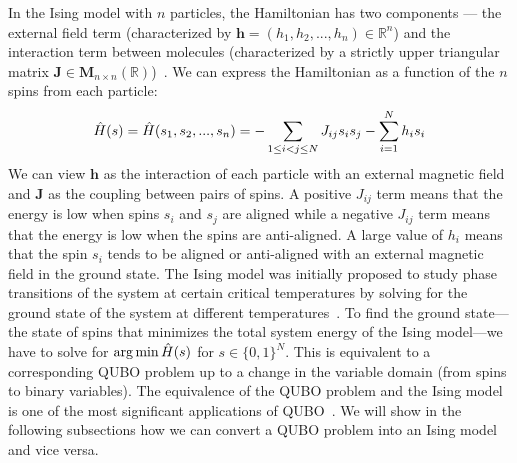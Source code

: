 In the Ising model with $n$ particles, the Hamiltonian has two components --- the external field term (characterized by $\mathbf{h} = (h_1, h_2, ..., h_n) \in \mathbb{R}^n$) and the interaction term between molecules (characterized by a strictly upper triangular matrix $\mathbf{J} \in \boldsymbol{M}_{n\times n}(\mathbb{R})$)~\cite{b10}. We can express the Hamiltonian as a function of the $n$ spins from each particle:
\begin{equation}
    \Hat{H}(s) = \Hat{H}(s_1, s_2, ... , s_n) = -\sum_{1\leq i < j \leq N} J_{ij}s_i s_j - \sum_{i=1}^N h_i s_i
\end{equation}
We can view $\mathbf{h}$ as the interaction of each particle with an external magnetic field and $\mathbf{J}$ as the coupling between pairs of spins. A positive $J_{ij}$ term means that the energy is low when spins $s_i$ and $s_j$ are aligned while a negative $J_{ij}$ term means that the energy is low when the spins are anti-aligned. A large value of $h_i$ means that the spin $s_i$ tends to be aligned or anti-aligned with an external magnetic field in the ground state.
The Ising model was initially proposed to study phase transitions of the system at certain critical temperatures by solving for the ground state of the system at different temperatures~\cite{isingising}. To find the ground state---the state of spins that minimizes the total system energy of the Ising model---we have to solve for $ \operatorname*{arg\,min} \Hat{H}(s) $ for $ s \in \{ 0, 1 \}^N $. This is equivalent to a corresponding QUBO problem up to a change in the variable domain (from spins to binary variables). The equivalence of the QUBO problem and the Ising model is one of the most significant applications of QUBO~\cite{b5}. We will show in the following subsections how we can convert a QUBO problem into an Ising model and vice versa.

